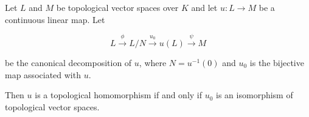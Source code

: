 Let $L$ and $M$ be topological vector spaces over $K$ and let $u: L \to M$ be a continuous linear map. Let

$$L \xrightarrow{\phi} L/N \xrightarrow{u_0} u(L) \xrightarrow{\psi} M$$

be the canonical decomposition of $u$, where $N = u^{-1}(0)$ and $u_0$ is the bijective map associated with $u$.

Then $u$ is a topological homomorphism if and only if $u_0$ is an isomorphism of topological vector spaces.
